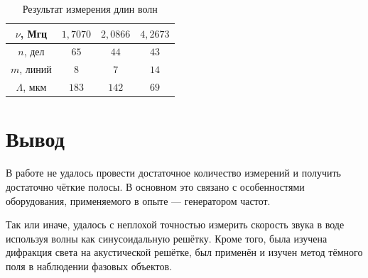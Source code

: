 \documentclass[a4paper]{article}
\begin{document}
\begin{table}[!ht]
    \centering
    \caption{Результат измерения длин волн}
    \begin{tabular}{|c|c|c|c|}
    \hline
    $\nu$, Мгц     & $1,7070$ & $2,0866$ & $4,2673$ \\ \hline
    $n$, дел       & $65$     & $44$     & $43$     \\ \hline
    $m$, линий     & $8$      & $7$      & $14$     \\ \hline
    $\Lambda$, мкм & $183$    & $142$    & $69$     \\ \hline
    \end{tabular}
\end{table}

\section{Вывод}

\noindent В работе не удалось провести достаточное количество измерений и получить достаточно чёткие полосы. В основном это связано с особенностями оборудования, применяемого в опыте --- генератором частот. \medskip

\noindent Так или иначе, удалось с неплохой точностью измерить скорость звука в воде используя волны как синусоидальную решётку. Кроме того, была изучена дифракция света на акустической решётке, был применён и изучен метод тёмного поля в наблюдении фазовых объектов.
\end{document}
